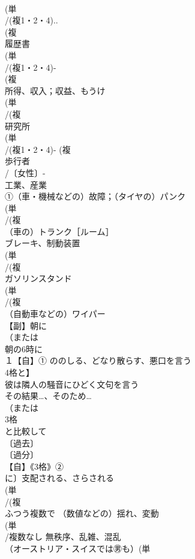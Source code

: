 \documentclass[8pt]{extreport}
\begin{document}
\begin{CJK}{UTF8}{min}
\\	(単
\\	/(複1・2・4)..
\\	(複
\\	履歴書
\\	(単
\\	/(複1・2・4)-
\\	(複
\\	所得、収入；収益、もうけ
\\	(単
\\	/(複
\\	研究所 
\\	(単
\\	/(複1・2・4)- (複
\\	歩行者 
\\	/〔女性〕-
\\	工業、産業 
\\	①（車・機械などの）故障；（タイヤの）パンク 
\\	(単
\\	/(複
\\	（車の）トランク［ルーム］ 
\\	ブレーキ、制動装置 
\\	(単
\\	/(複
\\	ガソリンスタンド 
\\	(単
\\	/(複
\\	（自動車などの）ワイパー
\\	【副】朝に 
\\	（または
\\	朝の6時に
\\	１【自】① ののしる、どなり散らす、悪口を言う 
\\	4格と】
\\	彼は隣人の騒音にひどく文句を言う
\\	その結果…、そのため… 
\\	（または
\\	3格	
\\	と比較して
\\	〔過去〕
\\	〔過分〕
\\	【自】《3格》②
\\	に〕支配される、さらされる
\\	(単
\\	/(複
\\	ふつう複数で （数値などの）揺れ、変動
\\	(単
\\	/複数なし 無秩序、乱雑、混乱
\\	（オーストリア・スイスでは㊚も）(単

\end{CJK}
\end{document}
